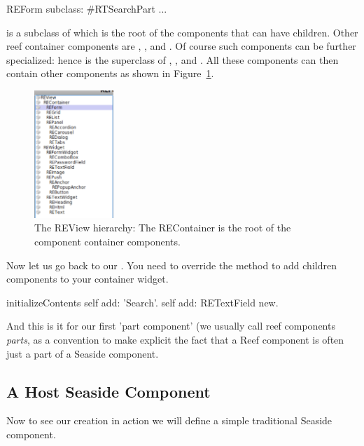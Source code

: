 \documentclass[a4paper,10pt,twoside]{book}
\begin{document}
\begin{code}{}
REForm subclass: #RTSearchPart
	...

\end{code}

 is a subclass of  which is the root of the components that can have children. Other reef container components are , , and . Of course such components can be further specialized: hence  is the superclass of , ,  and . All these components can then contain other components as shown in Figure~\ref{review}. 


\begin{figure}[h]
\begin{center}
\includegraphics[width=3cm]{REViewHierarchy}
\caption{The REView hierarchy: The REContainer is the root of the component container components.\label{review}}
\end{center}
\end{figure}


Now let us go back to our .  You need to override the method  to add children components to your container widget. 

\begin{code}{}
initializeContents
	self add: 'Search'.
	self add: RETextField new.
\end{code}


And this is it for our first 'part component' (we usually call reef components \emph{parts}, as a convention to make explicit the fact that a Reef component is often just a part of a Seaside component.


\subsection{A Host Seaside Component}
Now to see our creation in action we will define a simple traditional Seaside component.
\end{document}
